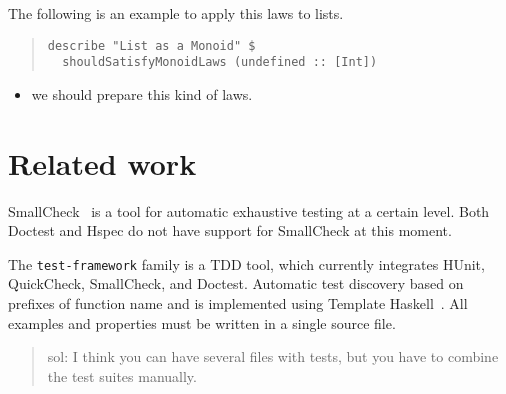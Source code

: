 \documentclass[preprint]{sigplanconf}
\begin{document}
\noindent The following is an example to apply this laws
to lists.

\begin{quote}
\small
\begin{verbatim}
describe "List as a Monoid" $
  shouldSatisfyMonoidLaws (undefined :: [Int])
\end{verbatim}
\end{quote}

\begin{itemize}
\item we should prepare this kind of laws.
\end{itemize}

\section{Related work}

SmallCheck~\cite{smallcheck} is a tool for
automatic exhaustive testing at a certain level.
Both Doctest and Hspec do not have support for SmallCheck
at this moment.

The {\tt test-framework} family is a TDD tool,
which currently integrates HUnit, QuickCheck, SmallCheck, and Doctest.
Automatic test discovery based on prefixes of function name
and is implemented using Template Haskell~\cite{template-haskell}.
All examples and properties must be written in a single
source file.

\begin{quote}
    sol: I think you can have several files with tests, but you have
    to combine the test suites manually.
\end{quote}
\end{document}
